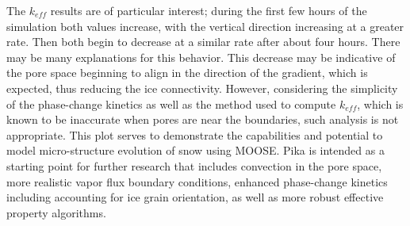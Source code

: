 The $k_{eff}$ results are of particular interest; during the first few hours of the simulation both values increase, with the vertical direction increasing at a greater rate. Then both begin to decrease at a similar rate after about four hours. There may be many explanations for this behavior. This decrease may be indicative of the pore space beginning to align in the direction of the gradient, which is expected, thus reducing the ice connectivity. However, considering the simplicity of the phase-change kinetics as well as the method used to compute $k_{eff}$, which is known to be inaccurate when pores are near the boundaries, such analysis is not appropriate. This plot serves to demonstrate the capabilities and potential to model micro-structure evolution of snow using MOOSE. Pika is intended as a starting point for further research that includes convection in the pore space, more realistic vapor flux boundary conditions, enhanced phase-change kinetics including accounting for ice grain orientation, as well as more robust effective property algorithms.

